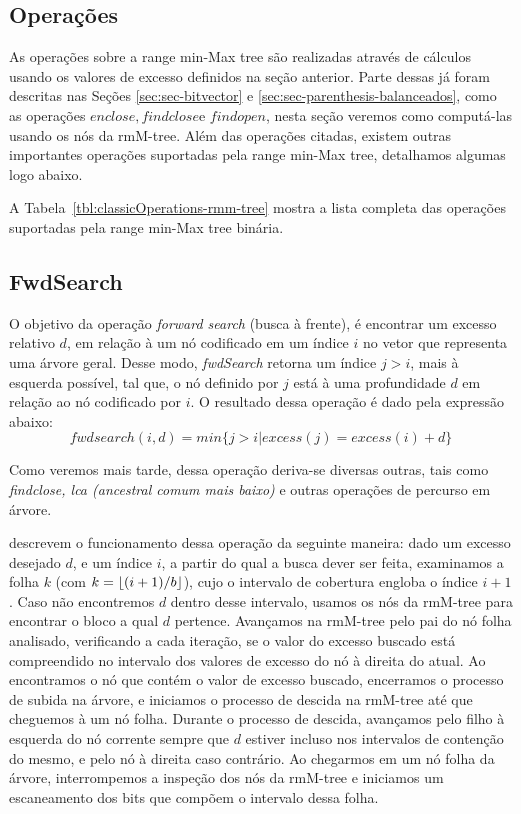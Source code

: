 \subsection{Operações}
As operações sobre a range min-Max tree são realizadas através de cálculos usando os valores de excesso definidos na seção anterior.  Parte dessas já foram descritas nas Seções \ref{sec:sec-bitvector} e \ref{sec:sec-parenthesis-balanceados}, como as operações  $enclose, findclose \mbox{e } findopen$, nesta seção veremos como computá-las usando os nós da rmM-tree.
Além das operações citadas, existem outras importantes operações suportadas pela range min-Max tree, detalhamos algumas logo abaixo. 

A Tabela~\ref{tbl:classicOperations-rmm-tree} mostra a lista completa das operações suportadas pela range min-Max tree binária.

\subsection{FwdSearch}
    O objetivo da operação \textit{forward search} (busca à frente), é encontrar um excesso relativo $d$, em relação à um nó codificado em um índice $i$ no vetor que representa uma árvore geral. Desse modo, \textit{ fwdSearch} retorna um índice $j>i$, mais à esquerda possível, tal que, o nó definido por $j$ está à uma profundidade $d$ em relação ao nó codificado por $i$. O resultado dessa operação é dado pela expressão abaixo:
    $$fwdsearch(i,d) = min\{j > i | excess(j) = excess(i) + d\}$$
    
    Como veremos mais tarde, dessa operação deriva-se diversas outras, tais como \textit{findclose, lca (ancestral comum mais baixo)} e outras operações de percurso em árvore.

    \citet{paper-simple-and-efficient-fully-functional-succinct-trees} descrevem o funcionamento dessa operação da seguinte maneira: dado um excesso desejado $d$, e um índice $i$, a partir do qual a busca dever ser feita, examinamos a folha $k$ (com $k= \lfloor(i+1)/b\rfloor$), cujo o intervalo de cobertura engloba o índice $i+1$.
    Caso não encontremos $d$ dentro desse intervalo, usamos os nós da rmM-tree para encontrar o bloco a qual $d$ pertence. Avançamos na rmM-tree pelo pai do nó folha analisado, verificando a cada iteração, se o valor do excesso buscado está compreendido no intervalo dos valores de excesso do nó à direita do atual. Ao encontramos o nó que contém o valor de excesso buscado, encerramos o processo de subida na árvore, e iniciamos o processo de descida na rmM-tree até que cheguemos à um nó folha. Durante o processo de descida, avançamos pelo filho à esquerda do nó corrente sempre que $d$ estiver incluso nos intervalos de contenção do mesmo, e pelo nó à direita caso contrário. Ao chegarmos em um nó folha da árvore, interrompemos a inspeção dos nós da rmM-tree e iniciamos um escaneamento dos bits que compõem o intervalo dessa folha.

